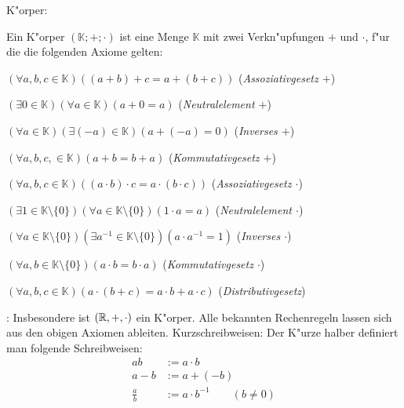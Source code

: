  K"orper:{
  Ein K"orper $({\mathbb K};+;\cdot)$ ist eine Menge $\mathbb K$ mit zwei
  Verkn"upfungen $+$ und $\cdot$, f"ur die
  die folgenden Axiome gelten:
  {
    \def\inK{ \in {\mathbb K} }
    \def\inKNull{ \in {\mathbb K \setminus \{0\}}}
    \begin{stmts}
      \item $(\forall a,b,c \inK)((a+b)+c=a+(b+c))$ 
        (\emph{Assoziativgesetz $+$})
      \item $(\exists 0 \inK)(\forall a \inK) (a+0=a)$ 
        (\emph{Neutralelement $+$})
      \item $(\forall a \inK)(\exists (-a) \inK) (a+(-a)=0)$ 
        (\emph{Inverses $+$})
      \item $(\forall a,b,c, \inK)(a+b=b+a)$ 
        (\emph{Kommutativgesetz $+$})
      \item $(\forall a,b,c \inK)((a\cdot b)\cdot c = a \cdot (b \cdot c))$ 
        (\emph{Assoziativgesetz $\cdot$})
      \item $(\exists 1 \inKNull)(\forall a \inKNull)(1\cdot a=a)$ 
        (\emph{Neutralelement $\cdot$})
      \item $(\forall a \inKNull)(\exists a^{-1} \inKNull)(a \cdot a^{-1}=1)$ 
        (\emph{Inverses $\cdot$})
      \item $(\forall a,b \inKNull)(a\cdot b=b\cdot a)$ 
        (\emph{Kommutativgesetz $\cdot$})
      \item $(\forall a,b,c \inK)(a\cdot(b+c)=a\cdot b + a \cdot c)$ 
        (\emph{Distributivgesetz})
      \end{stmts}
    }
  }
\remark:{
  Insbesondere ist $(\mathbb R,+,\cdot)$ ein K"orper. Alle bekannten
  Rechenregeln lassen sich aus den obigen Axiomen ableiten.
  }
 Kurzschreibweisen:{
  Der K"urze halber definiert man folgende Schreibweisen:
  \begin{align*}
    ab &:= a \cdot b\\
    a-b &:= a+(-b)\\
    \frac a b &:= a\cdot b^{-1}\qquad (b\ne 0)
    \end{align*}
  }

